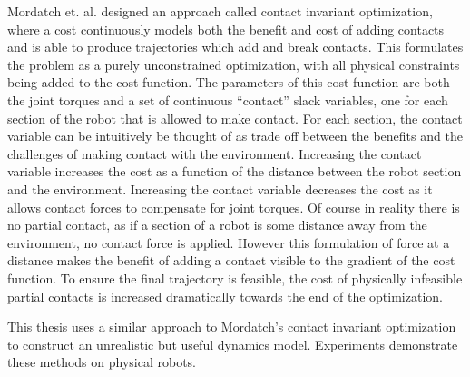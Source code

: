\documentclass[../thesis.tex]{subfiles}
\begin{document}
Mordatch et. al. \cite{Mordatch2012} designed an approach called contact invariant optimization, where a cost continuously models both the benefit and cost of adding contacts and is able to produce trajectories which add and break contacts.
This formulates the problem as a purely unconstrained optimization, with all physical constraints being added to the cost function.
The parameters of this cost function are both the joint torques and a set of continuous ``contact'' slack variables, one for each section of the robot that is allowed to make contact.
For each section, the contact variable can be intuitively be thought of as trade off between the benefits and the challenges of making contact with the environment.
Increasing the contact variable increases the cost as a function of the distance between the robot section and the environment.
Increasing the contact variable decreases the cost as it allows contact forces to compensate for joint torques.
Of course in reality there is no partial contact, as if a section of a robot is some distance away from the environment, no contact force is applied.
However this formulation of force at a distance makes the benefit of adding a contact visible to the gradient of the cost function.
To ensure the final trajectory is feasible, the cost of physically infeasible partial contacts is increased dramatically towards the end of the optimization. 

This thesis uses a similar approach to Mordatch's contact invariant optimization to construct an unrealistic but useful dynamics model.
Experiments demonstrate these methods on physical robots.
\end{document}
